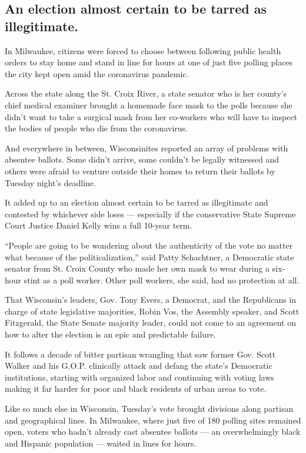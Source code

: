 \hypertarget{an-election-almost-certain-to-be-tarred-as-illegitimate}{%
\subsection{An election almost certain to be tarred as
illegitimate.}\label{an-election-almost-certain-to-be-tarred-as-illegitimate}}

In Milwaukee, citizens were forced to choose between following public
health orders to stay home and stand in line for hours at one of just
five polling places the city kept open amid the coronavirus pandemic.

Across the state along the St. Croix River, a state senator who is her
county's chief medical examiner brought a homemade face mask to the
polls because she didn't want to take a surgical mask from her
co-workers who will have to inspect the bodies of people who die from
the coronavirus.

And everywhere in between, Wisconsinites reported an array of problems
with absentee ballots. Some didn't arrive, some couldn't be legally
witnessed and others were afraid to venture outside their homes to
return their ballots by Tuesday night's deadline.

It added up to an election almost certain to be tarred as illegitimate
and contested by whichever side loses --- especially if the conservative
State Supreme Court Justice Daniel Kelly wins a full 10-year term.

``People are going to be wondering about the authenticity of the vote no
matter what because of the politicalization,'' said Patty Schachtner, a
Democratic state senator from St. Croix County who made her own mask to
wear during a six-hour stint as a poll worker. Other poll workers, she
said, had no protection at all.

That Wisconsin's leaders, Gov. Tony Evers, a Democrat, and the
Republicans in charge of state legislative majorities, Robin Vos, the
Assembly speaker, and Scott Fitzgerald, the State Senate majority
leader, could not come to an agreement on how to alter the election is
an epic and predictable failure.

It follows a decade of bitter partisan wrangling that saw former Gov.
Scott Walker and his G.O.P. clinically attack and defang the state's
Democratic institutions, starting with organized labor and continuing
with voting laws making it far harder for poor and black residents of
urban areas to vote.

Like so much else in Wisconsin, Tuesday's vote brought divisions along
partisan and geographical lines. In Milwaukee, where just five of 180
polling sites remained open, voters who hadn't already cast absentee
ballots --- an overwhelmingly black and Hispanic population --- waited
in lines for hours.

